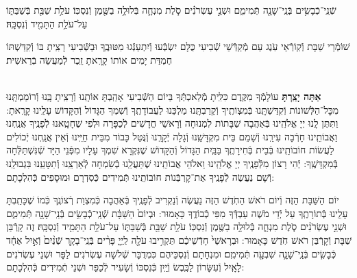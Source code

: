 \documentclass[twoside, openany, parskip=half, 11pt]{book}
\begin{document}
שְֿׁנֵֽי־כְֿבָשִׂ֥ים בְּֿנֵֽי־שָׁנָ֖ה תְּֿמִימִ֑ם וּשְׁנֵ֣י עֶשְׂרֹנִ֗ים סֹ֧לֶת מִנְחָ֛ה בְּֿלוּלָ֥ה בַשֶּׁ֖מֶן וְֿנִסְכּֽוֹ׃ עֹלַ֥ת שַׁבַּ֖ת בְּֿשַׁבַּתּ֑וֹ עַל־עֹלַ֥ת הַתָּמִ֖יד וְֿנִסְכָּֽהּ׃

שׁוֹמְֿרֵי שַׁבָּת וְֿקֽוֹרְֿאֵי עֹֽנֶג עַם מְֿקַדְּֿשֵׁי שְֿׁבִיעִי כֻּלָּם יִשְׂבְּֿעוּ וְֿיִתְעַנְּֿגוּ מִטּוּבֶֽךָ וּבַשְּֿׁבִיעִי רָצִֽיתָ בּוֹ וְֿקִדַּשְׁתּוֹ חֶמְדַּת יָמִים אוֹתוֹ קָרָֽאתָ זֵֽכֶר לְֿמַעֲשֵׂה בְֿרֵאשִׁית׃

\shabboskiddushhayom {}

\begin{sometimes}

\label{shabbosroshchodesh}
\\
\textbf{אַתָּה יָצַֽרְתָּ}
עוֹלָמְֿךָ מִקֶּֽדֶם כִּלִּֽיתָ מְֿלַאכְתְּֿךָ בַּיוֹם הַשְּֿׁבִיעִי אָהַֽבְתָּ אוֹתָֽנוּ וְֿרָצִֽיתָ בָּֽנוּ וְֿרוֹמַמְתָּֽנוּ מִכׇּל־הַלְּֿשׁוֹנוֹת וְֿקִדַּשְׁתָּֽנוּ בְּֿמִצְוֹתֶֽיךָ וְֿקֵרַבְתָּֽנוּ מַלְכֵּנוּ לַעֲבוֹדָתֶֽךָ וְֿשִׁמְךָ הַגָּדוֹל וְֿהַקָּדוֹשׁ עָלֵֽינוּ קָרָֽאתָ: וַתִּתֶּן לָֽנוּ יְיָ אֱלֹהֵֽינוּ בְּֿאַהֲבָה שַׁבָּתוֹת לִמְנוּחָה וְֿרָאשֵׁי חֳדָשִׁים לְֿכַפָּרָה וּלְפִי שֶׁחָטָֽאנוּ לְֿפָנֶֽיךָ אֲנַֽחְנוּ וַאֲבוֹתֵֽינוּ חָרְֿבָה עִירֵֽנוּ וְֿשָׁמֵם בֵּית מִקְדָּשֵֽׁנוּ וְֿגָלָה יְֿקָרֵֽנוּ וְֿנֻּטַּל כָּבוֹד מִבֵּית חַיֵּֽינוּ וְֿאֵין אֲנַֽחְנוּ יְֿכוֹלִים לַעֲשׂוֹת חוֹבוֹתֵֽינוּ בְּֿבֵית בְּֿחִירָתֶֽךָ בַּבַּֽיִת הַגָּדוֹל וְֿהַקָּדוֹשׁ שֶׁנִּקְרָא שִׁמְךָ עָלָיו מִפְּֿנֵי הַיָּד שְֿׁנִּשְׁתַּלְּֿחָה בְּֿמִקְדָּשֶֽׁךָ: יְֿהִי רָצוֹן מִלְּֿפָנֶֽיךָ יְיָ אֱלֹהֵֽינוּ וֵאלֹהֵי אֲבוֹתֵֽינוּ שֶׁתַּעֲלֵֽנוּ בְֿשִׂמְחָה לְֿאַרְצֵֽנוּ וְֿתִטָּעֵֽנוּ בִּגְבוּלֵֽנוּ וְֿשָׁם נַעֲשֶׂה לְֿפָנֶֽיךָ אֶת־קׇרְבְּֿנוֹת חוֹבוֹתֵֽינוּ תְּֿמִידִים כְּֿסִדְרָם וּמוּסָפִים כְּֿהִלְכָתָם:

יוֹם הַשַּׁבָּת הַזֶּה וְֿיוֹם רֹאשׁ הַחֹֽדֶשׁ הַזֶּה נַעֲשֶׂה וְֿנַקְרִיב לְֿפָנֶֽיךָ בְּֿאַהֲבָה כְּֿמִצְוַת רְֿצוֹנֶֽךָ כְּֿמוֹ שֶׁכָּתַֽבְתָּ עָלֵֽינוּ בְּֿתוֹרָתֶֽךָ עַל יְֿדֵי מֹשֶׁה עַבְדְּֿךָ מִפִּי כְֿבוֹדֶֽךָ כָּאָמוּר: וּבְיוֹם֙ הַשַּׁבָּ֔ת שְֿׁנֵֽי־כְֿבָשִׂ֥ים בְּֿנֵֽי־שָׁנָ֖ה תְּֿמִימִ֑ם וּשְׁנֵ֣י עֶשְׂרֹנִ֗ים סֹ֧לֶת מִנְחָ֛ה בְּֿלוּלָ֥ה בַשֶּׁ֖מֶן וְֿנִסְכּֽוֹ׃ עֹלַ֥ת שַׁבַּ֖ת בְּֿשַׁבַּתּ֑וֹ עַל־עֹלַ֥ת הַתָּמִ֖יד וְֿנִסְכָּֽהּ׃ זֶה קָרְֿבַּן שַׁבָּת וְֿקָרְֿבַּן רֹאשׁ חֹֽדֶשׁ כָּאָמוּר: וּבְרָאשֵׁי֙ חָדְֿשֵׁיכֶ֔ם תַּקְרִ֥יבוּ עֹלָ֖ה לַֽיְיָ֑ פָּרִ֨ים בְּֿנֵֽי־בָקָ֤ר שְֿׁנַ֨יִם֙ וְֿאַ֣יִל אֶחָ֔ד כְּֿבָשִׂ֧ים בְּֿנֵֽי־שָׁנָ֛ה שִׁבְעָ֖ה תְּֿמִימִֽם׃ וּמִנְחָתָם וְֿנִסְכֵּיהֶם כִּמְדֻבָּר שְֿׁלֹשָׁה עֶשְׂרֹנִים לַפָּר וּשְׁנֵי עֶשְׂרֹנִים לָאָֽיִל וְֿעִשָּׂרוֹן לַכֶּֽבֶשׂ וְֿיַֽיִן כְּֿנִסְכּוֹ וְֿשָׂעִיר לְֿכַפֵּר וּשְׁנֵי תְֿמִידִים כְּֿהִלְכָתָם:


\end{sometimes}
\end{document}
